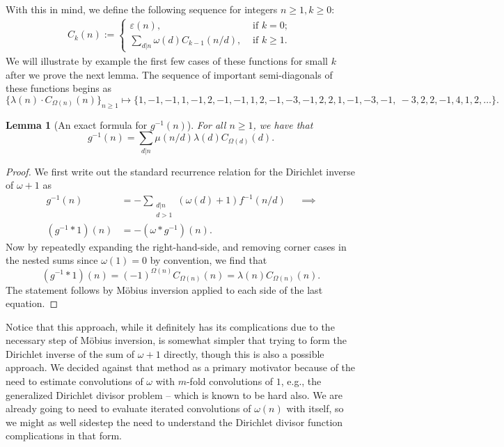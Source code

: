 \documentclass[11pt,reqno,a4letter]{article}
\numberwithin{figure}{section}
\numberwithin{table}{section}
\newcommand{\seqnum}[1]{\href{http://oeis.org/#1}{\color{ProcessBlue}{\underline{#1}}}}
\theoremstyle{plain}
\newtheorem{lemma}[theorem]{Lemma}
\numberwithin{theorem}{section}
\theoremstyle{definition}
\begin{document}
With this in mind, we define the following sequence for integers $n \geq 1, k \geq 0$: 
\begin{align} 
C_k(n) := \begin{cases} 
     \varepsilon(n), & \text{ if $k = 0$; } \\ 
     \sum\limits_{d|n} \omega(d) C_{k-1}(n/d), & \text{ if $k \geq 1$. } 
     \end{cases} 
\end{align} 
We will illustrate by example the first few cases of these functions for small $k$ after we prove 
the next lemma. 
The sequence of important semi-diagonals of these functions begins as 
\cite[\seqnum{A008480}]{OEIS} 
\[
\{\lambda(n) \cdot C_{\Omega(n)}(n) \}_{n \geq 1} \mapsto \{
     1, -1, -1, 1, -1, 2, -1, -1, 1, 2, -1, -3, -1, 2, 2, 1, -1, -3, -1, \
     -3, 2, 2, -1, 4, 1, 2, \ldots \}. 
\]

\begin{lemma}[An exact formula for $g^{-1}(n)$] 
\label{lemma_AnExactFormulaFor_gInvByMobiusInv_v1} 
For all $n \geq 1$, we have that 
\[
g^{-1}(n) = \sum_{d|n} \mu(n/d) \lambda(d) C_{\Omega(d)}(d). 
\]
\end{lemma}
\begin{proof} 
We first write out the standard recurrence relation for the Dirichlet inverse of 
$\omega+1$ as 
\begin{align*} 
g^{-1}(n) & = - \sum_{\substack{d|n \\ d>1}} (\omega(d) + 1) f^{-1}(n/d) && \implies \\ 
     (g^{-1} \ast 1)(n) & = -(\omega \ast g^{-1})(n). 
\end{align*} 
Now by repeatedly expanding the right-hand-side, and removing corner cases in the nested sums since 
$\omega(1) = 0$ by convention, we find that 
\[
(g^{-1} \ast 1)(n) = (-1)^{\Omega(n)} C_{\Omega(n)}(n) = \lambda(n) C_{\Omega(n)}(n). 
\]
The statement follows by M\"obius inversion applied to each side of the last equation. 
\end{proof}

Notice that this approach, while it definitely has its complications due to the necessary step of 
M\"obius inversion, is somewhat simpler that trying to form the Dirichlet inverse of the sum of 
$\omega+1$ directly, though this is also a possible approach. We decided against that method as a 
primary motivator because of the need to estimate convolutions of $\omega$ with $m$-fold convolutions 
of $1$, e.g., the generalized Dirichlet divisor problem -- which is known to be hard also. 
We are already going to need to evaluate iterated convolutions of $\omega(n)$ with itself, so we might 
as well sidestep the need to understand the Dirichlet divisor function complications in that form. 
\end{document}
